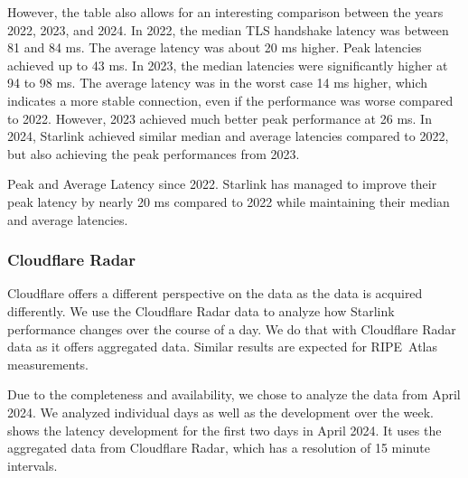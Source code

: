 However, the table also allows for an interesting comparison between the years
2022, 2023, and 2024. In 2022, the median TLS handshake latency was between 81
and 84 ms. The average latency was about 20 ms higher. Peak latencies achieved
up to 43 ms. In 2023, the median latencies were significantly higher at 94 to
98 ms. The average latency was in the worst case 14 ms higher, which indicates
a more stable connection, even if the performance was worse compared to 2022.
However, 2023 achieved much better peak performance at 26 ms. In 2024, Starlink
achieved similar median and average latencies compared to 2022, but also
achieving the peak performances from 2023.

\begin{takeaway}{Peak and Average Latency since 2022.}
	Starlink has managed to improve their peak latency by nearly 20 ms
	compared to 2022 while maintaining their median and average latencies.
\end{takeaway}

\subsubsection*{Cloudflare Radar}

Cloudflare offers a different perspective on the data as the data is acquired
differently. We use the Cloudflare Radar data to analyze how Starlink
performance changes over the course of a day. We do that with Cloudflare Radar
data as it offers aggregated data. Similar results are expected for RIPE~Atlas
measurements.

Due to the completeness and availability, we chose to analyze the data from
April 2024. We analyzed individual days as well as the development over the
week.  shows the latency
development for the first two days in April 2024. It uses the aggregated data
from Cloudflare Radar, which has a resolution of 15 minute intervals.

